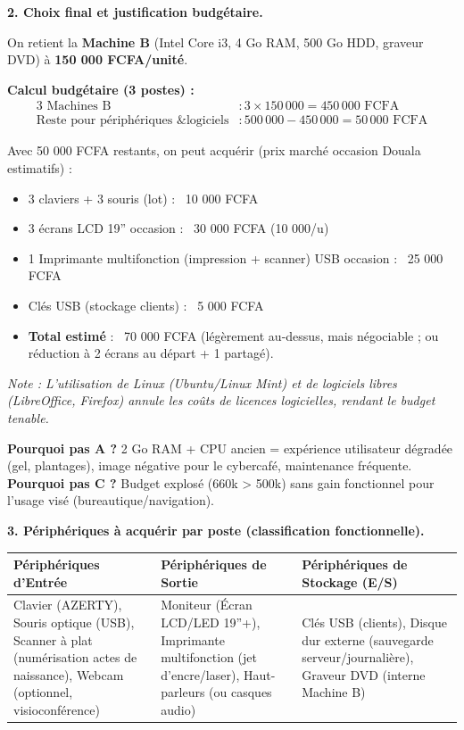 \documentclass[11pt]{article}
\begin{document}
\begin{exoresolu}
\textbf{2. Choix final et justification budgétaire.}

On retient la \textbf{Machine B} (Intel Core i3, 4 Go RAM, 500 Go HDD, graveur DVD) à \textbf{150 000 FCFA/unité}.

\textbf{Calcul budgétaire (3 postes) :}
\begin{align*}
\text{3 Machines B} & : 3 \times 150\,000 = 450\,000 \text{ FCFA} \\
\text{Reste pour périphériques \& logiciels} & : 500\,000 - 450\,000 = 50\,000 \text{ FCFA}
\end{align*}

Avec 50 000 FCFA restants, on peut acquérir (prix marché occasion Douala estimatifs) :
\begin{itemize}
\item 3 claviers + 3 souris (lot) : ~10 000 FCFA
\item 3 écrans LCD 19'' occasion : ~30 000 FCFA (10 000/u)
\item 1 Imprimante multifonction (impression + scanner) USB occasion : ~25 000 FCFA
\item Clés USB (stockage clients) : ~5 000 FCFA
\item \textbf{Total estimé} : ~70 000 FCFA (légèrement au-dessus, mais négociable ; ou réduction à 2 écrans au départ + 1 partagé).
\end{itemize}
\textit{Note : L'utilisation de Linux (Ubuntu/Linux Mint) et de logiciels libres (LibreOffice, Firefox) annule les coûts de licences logicielles, rendant le budget tenable.}

\textbf{Pourquoi pas A ?} 2 Go RAM + CPU ancien = expérience utilisateur dégradée (gel, plantages), image négative pour le cybercafé, maintenance fréquente. \textbf{Pourquoi pas C ?} Budget explosé (660k > 500k) sans gain fonctionnel pour l'usage visé (bureautique/navigation).

\textbf{3. Périphériques à acquérir par poste (classification fonctionnelle).}

\begin{center}
\begin{tabularx}{\linewidth}{|>{\raggedright\arraybackslash}X|>{\centering\arraybackslash}X|>{\centering\arraybackslash}X|}
\hline
\rowcolor{popblueL} \textbf{Périphériques d'Entrée} & \textbf{Périphériques de Sortie} & \textbf{Périphériques de Stockage (E/S)} \\
\hline
Clavier (AZERTY), Souris optique (USB), Scanner à plat (numérisation actes de naissance), Webcam (optionnel, visioconférence) & Moniteur (Écran LCD/LED 19''+), Imprimante multifonction (jet d'encre/laser), Haut-parleurs (ou casques audio) & Clés USB (clients), Disque dur externe (sauvegarde serveur/journalière), Graveur DVD (interne Machine B) \\
\hline
\end{tabularx}
\end{center}


\end{exoresolu}
\end{document}

